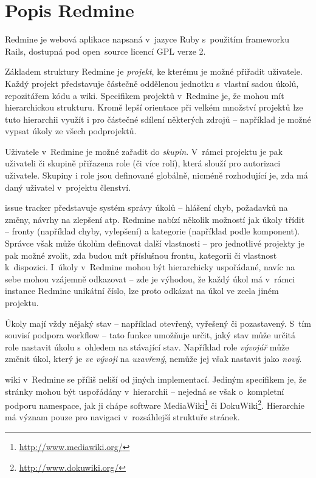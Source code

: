 \documentclass[thesis=B,czech]{FITthesis}[2012/05/02]
\begin{document}
\section{Popis Redmine}

Redmine je webová aplikace napsaná v~jazyce Ruby s~použitím frameworku
Rails, dostupná pod open~source licencí \gls{GPL} verze 2.

Základem struktury Redmine je \emph{projekt}, ke kterému je možné
přiřadit uživatele. Každý projekt představuje částečně oddělenou
jednotku s~vlastní sadou úkolů, repozitářem kódu a \gls{wiki}.
Specifikem projektů v~Redmine je, že mohou mít hierarchickou strukturu.
Kromě lepší orientace při velkém množství projektů lze tuto hierarchii
využít i pro částečné sdílení některých zdrojů -- například je možné
vypsat úkoly ze všech podprojektů.

Uživatele v~Redmine je možné zařadit do \emph{skupin}. V~rámci projektu
je pak uživateli či skupině přiřazena role (či více rolí), která slouží
pro autorizaci uživatele. Skupiny i role jsou definované globálně,
nicméně rozhodující je, zda má daný uživatel v~projektu členství.

\Gls{issue tracker} představuje systém správy úkolů -- hlášení chyb,
požadavků na změny, návrhy na zlepšení atp. Redmine nabízí několik
možností jak úkoly třídit -- fronty (například chyby, vylepšení) a
kategorie (například podle komponent). Správce však může úkolům
definovat další vlastnosti -- pro jednotlivé projekty je pak možné
zvolit, zda budou mít příslušnou frontu, kategorii či vlastnost
k~dispozici. I~úkoly v~Redmine mohou být hierarchicky uspořádané, navíc na
sebe mohou vzájemně odkazovat -- zde je výhodou, že každý úkol má
v~rámci instance Redmine unikátní číslo, lze proto odkázat na úkol ve
zcela jiném projektu.

Úkoly mají vždy nějaký stav -- například otevřený, vyřešený či
pozastavený. S~tím souvisí podpora \gls{workflow} -- tato funkce
umožňuje určit, jaký stav může určitá role nastavit úkolu s~ohledem na
stávající stav. Například role \emph{vývojář} může změnit úkol, který je
\emph{ve vývoji} na \emph{uzavřený}, nemůže jej však nastavit jako
\emph{nový}.

\Gls{wiki} v~Redmine se příliš neliší od jiných implementací. Jediným
specifikem je, že stránky mohou být uspořádány v~hierarchii -- nejedná
se však o~kompletní podporu \gls{namespace}, jak ji chápe software
MediaWiki\footnote{\url{http://www.mediawiki.org/}} či
DokuWiki\footnote{\url{http://www.dokuwiki.org/}}. Hierarchie má význam
pouze pro navigaci v~rozsáhlejší struktuře stránek.
\end{document}
